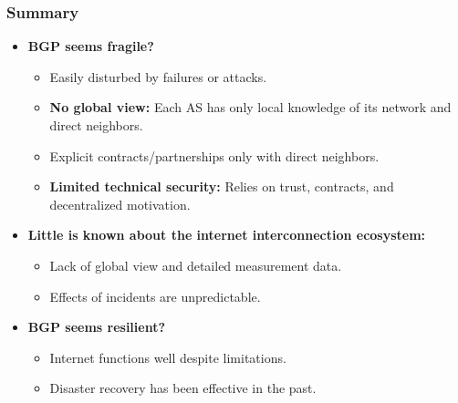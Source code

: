 \subsubsection{Summary}
\begin{itemize}
    \item \textbf{BGP seems fragile?}
    \begin{itemize}
        \item Easily disturbed by failures or attacks.
        \item \textbf{No global view:} Each AS has only local knowledge of its network and direct neighbors.
        \item Explicit contracts/partnerships only with direct neighbors.
        \item \textbf{Limited technical security:} Relies on trust, contracts, and decentralized motivation.
    \end{itemize}
    \item \textbf{Little is known about the internet interconnection ecosystem:}
    \begin{itemize}
        \item Lack of global view and detailed measurement data.
        \item Effects of incidents are unpredictable.
    \end{itemize}
    \item \textbf{BGP seems resilient?}
    \begin{itemize}
        \item Internet functions well despite limitations.
        \item Disaster recovery has been effective in the past.
    \end{itemize}
\end{itemize}


